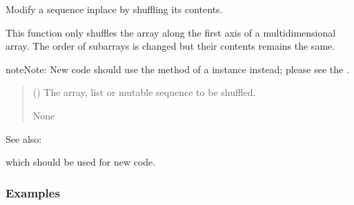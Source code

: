\documentclass[letterpaper,10pt,english]{sphinxmanual}
\begin{document}

\begin{fulllineitems}
\label{\detokenize{metilda.controllers:metilda.controllers.pitch_art_wizard.shuffle}}
\pysigstartsignatures
{}
\pysigstopsignatures
\sphinxAtStartPar
Modify a sequence in\sphinxhyphen{}place by shuffling its contents.

\sphinxAtStartPar
This function only shuffles the array along the first axis of a
multi\sphinxhyphen{}dimensional array. The order of sub\sphinxhyphen{}arrays is changed but
their contents remains the same.

\begin{sphinxadmonition}{note}{Note:}
\sphinxAtStartPar
New code should use the 
method of a  instance instead;
please see the .
\end{sphinxadmonition}
\begin{quote}\begin{description}
\sphinxAtStartPar
{} () \textendash{} The array, list or mutable sequence to be shuffled.

\sphinxAtStartPar
None

\end{description}\end{quote}


\begin{sphinxseealso}{See also:}
\begin{description}
\sphinxAtStartPar
which should be used for new code.

\end{description}


\end{sphinxseealso}

\subsubsection*{Examples}


\end{fulllineitems}
\end{document}
